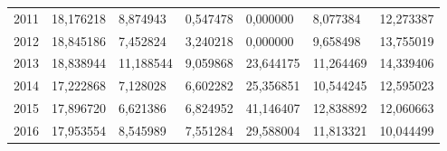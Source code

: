 \begin{table}
\begin{tabular}{p{1cm}p{2cm}p{2cm}p{2cm}p{2cm}p{2cm}p{2cm}}
 2011 &                        18,176218 &      8,874943 &         0,547478 &                            0,000000 &                        8,077384 &          12,273387 \\
 2012 &                        18,845186 &      7,452824 &         3,240218 &                            0,000000 &                        9,658498 &          13,755019 \\
 2013 &                        18,838944 &     11,188544 &         9,059868 &                           23,644175 &                       11,264469 &          14,339406 \\
 2014 &                        17,222868 &      7,128028 &         6,602282 &                           25,356851 &                       10,544245 &          12,595023 \\
 2015 &                        17,896720 &      6,621386 &         6,824952 &                           41,146407 &                       12,838892 &          12,060663 \\
 2016 &                        17,953554 &      8,545989 &         7,551284 &                           29,588004 &                       11,813321 &          10,044499 \\
\bottomrule
\end{tabular}
\end{table}
